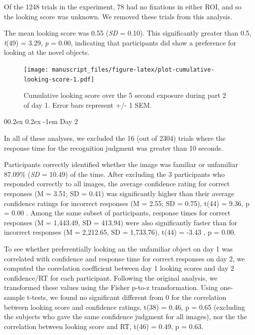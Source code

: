 \documentclass[
  man,floatsintext]{apa6}
\makeatletter
\let\oldparagraph\paragraph
\renewcommand{\paragraph}[1]{\oldparagraph{#1}\mbox{}}
\renewcommand{\paragraph}{\@startsection{paragraph}{4}{\parindent}%
  {0\baselineskip \@plus 0.2ex \@minus 0.2ex}%
  {-1em}%
  {\normalfont\normalsize\bfseries\itshape\typesectitle}}
\makeatother
\begin{document}
Of the 1248 trials in the experiment, 78 had no fixations in either ROI, and so the looking score was unknown. We removed these trials from this analysis.

The mean looking score was 0.55 (\emph{SD} = 0.10). This significantly greater than 0.5, \emph{t}(49) = 3.29, \emph{p} = 0.00, indicating that participants did show a preference for looking at the novel objects.

\begin{figure}
\centering
\texttt{[image: manuscript\_files/figure-latex/plot-cumulative-looking-score-1.pdf]}
\caption{\label{fig:plot-cumulative-looking-score}Cumulative looking score over the 5 second exposure during part 2 of day 1. Error bars represent +/- 1 SEM.}
\end{figure}

\paragraph{Day 2}\label{day-2}

In all of these analyses, we excluded the 16 (out of 2304) trials where the response time for the recognition judgment was greater than 10 seconds.

Participants correctly identified whether the image was familiar or unfamiliar 87.09\% (\emph{SD} = 10.49) of the time. After excluding the 3 participants who responded correctly to all images, the average confidence rating for correct responses (M = 3.51; SD = 0.41) was significantly higher than their average confidence ratings for incorrect responses (M = 2.55; SD = 0.75), t(44) = 9.36, p = 0.00 . Among the same subset of participants, response times for correct responses (M = 1,443.49, SD = 413.94) were also significantly faster than for incorrect responses (M = 2,212.65, SD = 1,733.76), t(44) = -3.43 , p = 0.00.

To see whether preferentially looking an the unfamiliar object on day 1 was correlated with confidence and response time for correct responses on day 2, we computed the correlation coefficient between day 1 looking scores and day 2 confidence/RT for each participant. Following the original analysis, we transformed these values using the Fisher p-to-z transformation. Using one-sample t-tests, we found no significant different from 0 for the correlation between looking score and confidence ratings, t(38) = 0.46, p = 0.65 (excluding the subjects who gave the same confidence judgment for all images), nor the the correlation between looking score and RT, t(46) = 0.49, p = 0.63.
\end{document}
